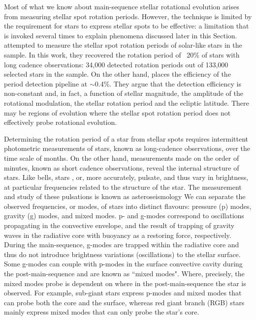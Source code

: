 Most of what we know about main-sequence stellar rotational evolution arises from measuring stellar spot rotation periods.
However, the technique is limited by the requirement for stars to express stellar spots to be effective: a limitation that is invoked several times to explain phenomena discussed later in this Section. 
\citet{mcquillan_rotation_2014} attempted to measure the stellar spot rotation periods of solar-like stars in the \kepler{} sample.
In this work, they recovered the rotation period of ~20\% of stars with long cadence observations: 34,000 detected rotation periods out of 133,000 selected stars in the sample.
On the other hand, \citet{distefano_gaia_2022} places the efficiency of the \GDRT period detection pipeline at $\sim$0.4\%.
They argue that the detection efficiency is non-constant and, in fact, a function of stellar magnitude, the amplitude of the rotational modulation, the stellar rotation period and the ecliptic latitude.
There may be regions of evolution where the stellar spot rotation period does not effectively probe rotational evolution.

Determining the rotation period of a star from stellar spots requires intermittent photometric measurements of stars, known as long-cadence observations, over the time scale of months. 
On the other hand, measurements made on the order of minutes, known as short cadence observations, reveal the internal structure of stars.
Like bells, stars , or, more accurately, pulsate, and thus vary in brightness, at particular frequencies related to the structure of the star. 
The measurement and study of these pulsations is known as asteroseismology \citep[see, e.g.][for thorough overviews]{christensen-dalsgaard_interpretation_1982,christensen-dalsgaard_comparison_1990, aerts_asteroseismology_2010, basu_asteroseismic_2017}
We can separate the observed frequencies, or modes, of stars into distinct flavours: pressure (p) modes, gravity (g) modes, and mixed modes.
p- and g-modes correspond to oscillations propagating in the convective envelope, and the result of trapping of gravity waves in the radiative core with buoyancy as a restoring force, respectively. 
During the main-sequence, g-modes are trapped within the radiative core and thus do not introduce brightness variations (oscillations) to the stellar surface.
Some g-modes can couple with p-modes in the surface convective cavity during the post-main-sequence and are known as ``mixed modes".
Where, precisely, the mixed modes probe is dependent on where in the post-main-sequence the star is observed.
For example, sub-giant stars express p-modes and mixed modes that can probe both the core and the surface, whereas red giant branch (RGB) stars mainly express mixed modes that can only probe the star's core.

